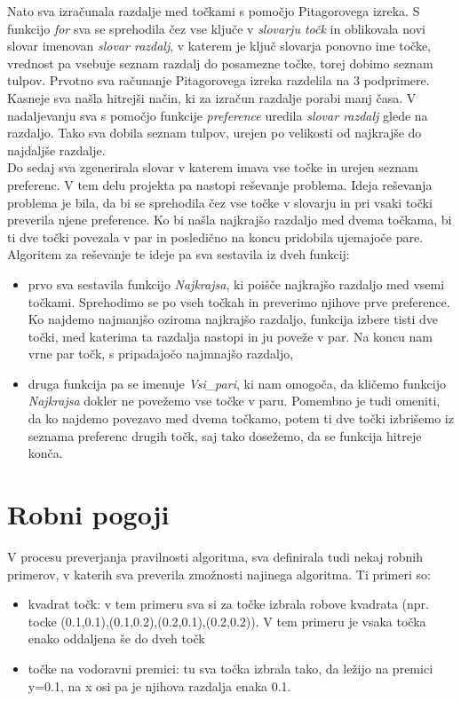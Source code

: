 \documentclass[12pt, a4paper]{article}
\begin{document}
Nato sva izračunala razdalje med točkami s pomočjo Pitagorovega izreka. S funkcijo \textit{for} sva se sprehodila čez vse ključe v \textit{slovarju točk} in oblikovala novi slovar imenovan \textit{slovar razdalj}, v katerem je ključ slovarja ponovno ime točke, vrednost pa vsebuje seznam razdalj do posamezne točke, torej dobimo seznam tulpov. Prvotno sva računanje Pitagorovega izreka  razdelila na 3 podprimere. Kasneje sva našla hitrejši način, ki za izračun razdalje porabi manj časa. V nadaljevanju sva s pomočjo funkcije \textit{preference} uredila \textit{slovar razdalj} glede na razdaljo. Tako sva dobila seznam tulpov, urejen po velikosti od najkrajše do najdaljše razdalje.  \\

Do sedaj sva zgenerirala slovar v katerem imava vse točke in urejen seznam preferenc.  V tem delu projekta pa nastopi reševanje problema. Ideja reševanja problema je bila, da bi se sprehodila čez vse točke v slovarju in pri vsaki točki preverila njene preference. Ko bi našla najkrajšo razdaljo med dvema točkama, bi ti dve točki povezala v par in posledično na koncu pridobila ujemajoče pare. Algoritem za reševanje te ideje pa sva sestavila iz dveh funkcij:
\begin{itemize}
	\item prvo sva sestavila funkcijo \textit{Najkrajsa}, ki poišče najkrajšo razdaljo med vsemi točkami. Sprehodimo se po vseh točkah in preverimo njihove prve preference. Ko najdemo najmanjšo oziroma najkrajšo razdaljo, funkcija izbere tisti dve točki, med katerima ta razdalja nastopi in ju poveže v par. Na koncu nam vrne par točk, s pripadajočo najmnajšo razdaljo,
	\item druga funkcija pa se imenuje \textit{Vsi_pari}, ki nam omogoča, da kličemo funkcijo \textit{Najkrajsa} dokler ne povežemo vse točke v paru. Pomembno je tudi omeniti, da ko najdemo povezavo med dvema točkamo, potem ti dve točki izbrišemo iz seznama preferenc drugih točk, saj tako dosežemo, da se funkcija hitreje konča.
\end{itemize}

\pagebreak
\section{Robni pogoji}
V procesu preverjanja pravilnosti algoritma, sva definirala tudi nekaj robnih primerov, v katerih sva preverila zmožnosti najinega algoritma. Ti primeri so:
\begin{itemize}
	\item kvadrat točk: v tem primeru sva si za točke izbrala robove kvadrata (npr. tocke (0.1,0.1),(0.1,0.2),(0.2,0.1),(0.2,0.2)). V tem primeru je vsaka točka enako oddaljena še do dveh točk
	\item točke na vodoravni premici: tu sva točka izbrala tako, da ležijo na premici y=0.1, na x osi pa je njihova razdalja enaka 0.1. 
\end{itemize} 
\end{document}
